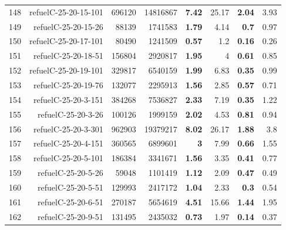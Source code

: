 \begin{longtable}{lrr@{\hskip 12pt}r@{\hskip 12pt}r@{\hskip 12pt}r@{\hskip 12pt}r@{\hskip 12pt}r}
148 & \multirow{1}{*}{refuelC-25-20-15-101} & \multirow{1}{*}{696120} & \multirow{1}{*}{14816867} & \textbf{7.42} & 25.17 & \textbf{2.04} & 3.93 \\
149 & \multirow{1}{*}{refuelC-25-20-15-26} & \multirow{1}{*}{88139} & \multirow{1}{*}{1741583} & \textbf{1.79} & 4.14 & \textbf{0.7} & 0.97 \\
150 & \multirow{1}{*}{refuelC-25-20-17-101} & \multirow{1}{*}{80490} & \multirow{1}{*}{1241509} & \textbf{0.57} & 1.2 & \textbf{0.16} & 0.26 \\
151 & \multirow{1}{*}{refuelC-25-20-18-51} & \multirow{1}{*}{156804} & \multirow{1}{*}{2920817} & \textbf{1.95} & 4 & \textbf{0.61} & 0.85 \\
152 & \multirow{1}{*}{refuelC-25-20-19-101} & \multirow{1}{*}{329817} & \multirow{1}{*}{6540159} & \textbf{1.99} & 6.83 & \textbf{0.35} & 0.99 \\
153 & \multirow{1}{*}{refuelC-25-20-19-76} & \multirow{1}{*}{132077} & \multirow{1}{*}{2295913} & \textbf{1.56} & 2.85 & \textbf{0.57} & 0.71 \\
154 & \multirow{1}{*}{refuelC-25-20-3-151} & \multirow{1}{*}{384268} & \multirow{1}{*}{7536827} & \textbf{2.33} & 7.19 & \textbf{0.35} & 1.22 \\
155 & \multirow{1}{*}{refuelC-25-20-3-26} & \multirow{1}{*}{100126} & \multirow{1}{*}{1999159} & \textbf{2.02} & 4.53 & \textbf{0.81} & 0.94 \\
156 & \multirow{1}{*}{refuelC-25-20-3-301} & \multirow{1}{*}{962903} & \multirow{1}{*}{19379217} & \textbf{8.02} & 26.17 & \textbf{1.88} & 3.8 \\
157 & \multirow{1}{*}{refuelC-25-20-4-151} & \multirow{1}{*}{360565} & \multirow{1}{*}{6899601} & \textbf{3} & 7.99 & \textbf{0.66} & 1.55 \\
158 & \multirow{1}{*}{refuelC-25-20-5-101} & \multirow{1}{*}{186384} & \multirow{1}{*}{3341671} & \textbf{1.56} & 3.35 & \textbf{0.41} & 0.77 \\
159 & \multirow{1}{*}{refuelC-25-20-5-26} & \multirow{1}{*}{59048} & \multirow{1}{*}{1101419} & \textbf{1.12} & 2.09 & \textbf{0.47} & 0.49 \\
160 & \multirow{1}{*}{refuelC-25-20-5-51} & \multirow{1}{*}{129993} & \multirow{1}{*}{2417172} & \textbf{1.04} & 2.33 & \textbf{0.3} & 0.54 \\
161 & \multirow{1}{*}{refuelC-25-20-6-51} & \multirow{1}{*}{270187} & \multirow{1}{*}{5654619} & \textbf{4.51} & 15.66 & \textbf{1.44} & 1.95 \\
162 & \multirow{1}{*}{refuelC-25-20-9-51} & \multirow{1}{*}{131495} & \multirow{1}{*}{2435032} & \textbf{0.73} & 1.97 & \textbf{0.14} & 0.37 \\
\bottomrule
\end{longtable}